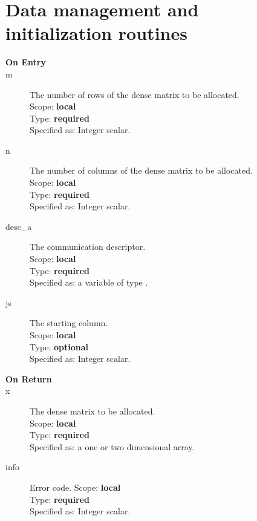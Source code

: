 \section{Data management and initialization routines}
%
%


\begin{description}
\item[\bf On Entry]
\item[m] The number of rows of the dense matrix to be allocated.\\
Scope: {\bf local} \\
Type: {\bf required}\\
Specified as: Integer scalar.
\item[n] The number of columns of the dense matrix to be allocated.\\
Scope: {\bf local} \\
Type: {\bf required}\\
Specified as: Integer scalar.
\item[desc\_a] The communication descriptor.\\
Scope: {\bf local} \\
Type: {\bf required}\\
Specified as: a variable of type \descdata.\\
\item[js] The starting column.\\
Scope: {\bf local} \\
Type: {\bf optional}\\
Specified as: Integer scalar.
\end{description}

\begin{description}
\item[\bf On Return]
\item[x] The dense matrix to be allocated.\\
Scope: {\bf local} \\
Type: {\bf required}\\
Specified as: a one or two dimensional array.\\
\item[info] Error code.
Scope: {\bf local} \\
Type: {\bf required}\\
Specified as: Integer scalar.
\end{description}

